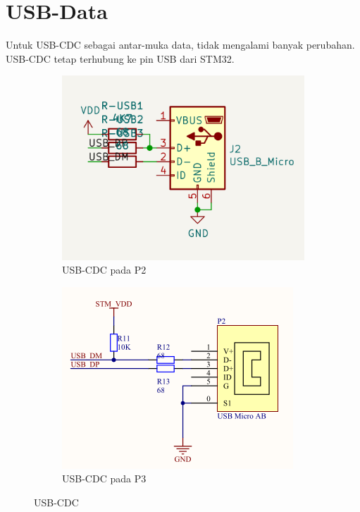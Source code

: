 \documentclass{book} %
\begin{document}
    \section{USB-Data}
    
    Untuk USB-CDC sebagai antar-muka data, tidak mengalami banyak perubahan.
    USB-CDC tetap terhubung ke pin USB dari STM32.
    
    \begin{figure}[!ht]
    	\centering
    	\begin{subfigure}[t]{0.4\textwidth}
    		\includegraphics[width=\textwidth]{images/p2_usb}
    		\caption{USB-CDC pada P2}
    	\end{subfigure}
    	\begin{subfigure}[t]{0.4\textwidth}
    		\includegraphics[width=\textwidth]{images/p3_usb}
    		\caption{USB-CDC pada P3}
    	\end{subfigure}
    	\caption{USB-CDC}
    \end{figure}
\end{document}
